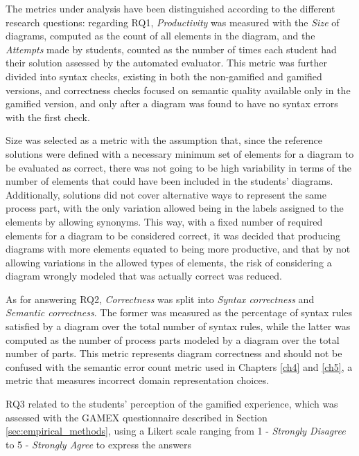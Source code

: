 The metrics under analysis have been distinguished according to the different research questions: regarding RQ1, \textit{Productivity} was measured with the \textit{Size} of diagrams, computed as the count of all elements in the diagram, and the \textit{Attempts} made by students, counted as the number of times each student had their solution assessed by the automated evaluator. This metric was further divided into syntax checks, existing in both the non-gamified and gamified versions, and correctness checks focused on semantic quality available only in the gamified version, and only after a diagram was found to have no syntax errors with the first check.

Size was selected as a metric with the assumption that, since the reference solutions were defined with a necessary minimum set of elements for a diagram to be evaluated as correct, there was not going to be high variability in terms of the number of elements that could have been included in the students' diagrams. Additionally, solutions did not cover alternative ways to represent the same process part, with the only variation allowed being in the labels assigned to the elements by allowing synonyms. This way, with a fixed number of required elements for a diagram to be considered correct, it was decided that producing diagrams with more elements equated to being more productive, and that by not allowing variations in the allowed types of elements, the risk of considering a diagram wrongly modeled that was actually correct was reduced.

As for answering RQ2, \textit{Correctness} was split into \textit{Syntax correctness} and \textit{Semantic correctness}. The former was measured as the percentage of syntax rules satisfied by a diagram over the total number of syntax rules, while the latter was computed as the number of process parts modeled by a diagram over the total number of parts. This metric represents diagram correctness and should not be confused with the semantic error count metric used in Chapters \ref{ch4} and \ref{ch5}, a metric that measures incorrect domain representation choices.

RQ3 related to the students' perception of the gamified experience, which was assessed with the GAMEX questionnaire described in Section \ref{sec:empirical_methods}, using a Likert scale ranging from 1 - \textit{Strongly Disagree} to 5 - \textit{Strongly Agree} to express the answers %

